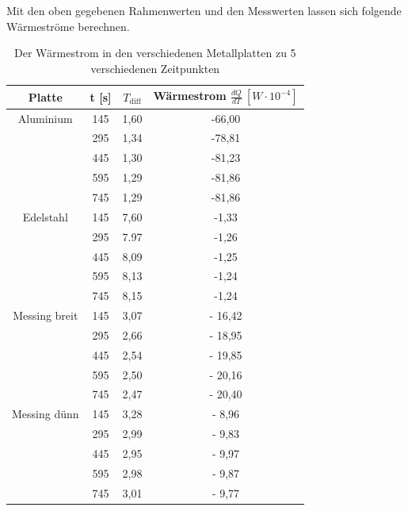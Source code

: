 \documentclass[titlepage = firstcover]{scrartcl}
\begin{document}
  Mit den oben gegebenen Rahmenwerten und den Messwerten lassen sich folgende Wärmeströme berechnen.

  \begin{table}[h]
    \centering
    \caption{Der Wärmestrom in den verschiedenen Metallplatten zu 5 verschiedenen Zeitpunkten}
    \label{tab:Wärmeströme}
    \begin{tabular}{c c c c}
      \toprule
      {Platte} & {t [s]} & {$T_{\text{diff}}$} & {Wärmestrom $\frac{dQ}{dT} \: [W \cdot 10^{-4}]$} \\
      \midrule
      Aluminium &    145      &      1,60       &     -66,00      \\ 
                &    295      &      1,34       &     -78,81      \\
                &    445      &      1,30       &     -81,23      \\
                &    595      &      1,29       &      -81,86     \\
                &    745      &      1,29       &      -81,86     \\
      Edelstahl &    145      &      7,60       &     -1,33      \\ 
                &    295      &      7.97       &     -1,26      \\
                &    445      &      8,09       &     -1,25      \\
                &    595      &      8,13       &     -1,24      \\
                &    745      &      8,15       &     -1,24      \\
  Messing breit &    145      &      3,07       &     - 16,42     \\ 
                &    295      &      2,66       &     - 18,95     \\
                &    445      &      2,54       &     - 19,85     \\
                &    595      &      2,50       &     - 20,16     \\
                &    745      &      2,47       &     - 20,40     \\
   Messing dünn &    145      &      3,28       &     - 8,96     \\ 
                &    295      &      2,99       &     - 9,83     \\
                &    445      &      2,95       &     - 9,97     \\
                &    595      &      2,98       &     - 9,87     \\
                &    745      &      3,01       &     - 9,77     \\
      \bottomrule
    \end{tabular}    
  \end{table}
\end{document}
